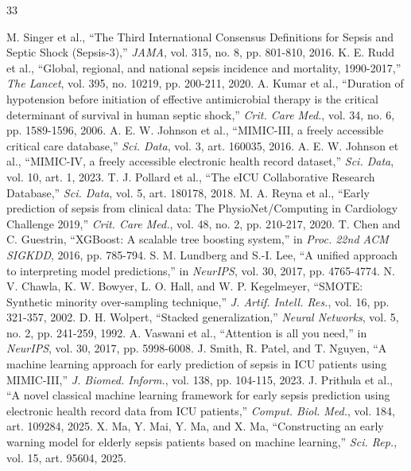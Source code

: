 \documentclass[conference]{IEEEtran}
\begin{document}
\begin{thebibliography}{33}

 M. Singer et al., ``The Third International Consensus Definitions for Sepsis and Septic Shock (Sepsis-3),'' \emph{JAMA}, vol. 315, no. 8, pp. 801-810, 2016.
 K. E. Rudd et al., ``Global, regional, and national sepsis incidence and mortality, 1990-2017,'' \emph{The Lancet}, vol. 395, no. 10219, pp. 200-211, 2020.
 A. Kumar et al., ``Duration of hypotension before initiation of effective antimicrobial therapy is the critical determinant of survival in human septic shock,'' \emph{Crit. Care Med.}, vol. 34, no. 6, pp. 1589-1596, 2006.
 A. E. W. Johnson et al., ``MIMIC-III, a freely accessible critical care database,'' \emph{Sci. Data}, vol. 3, art. 160035, 2016.
 A. E. W. Johnson et al., ``MIMIC-IV, a freely accessible electronic health record dataset,'' \emph{Sci. Data}, vol. 10, art. 1, 2023.
 T. J. Pollard et al., ``The eICU Collaborative Research Database,'' \emph{Sci. Data}, vol. 5, art. 180178, 2018.
 M. A. Reyna et al., ``Early prediction of sepsis from clinical data: The PhysioNet/Computing in Cardiology Challenge 2019,'' \emph{Crit. Care Med.}, vol. 48, no. 2, pp. 210-217, 2020.
 T. Chen and C. Guestrin, ``XGBoost: A scalable tree boosting system,'' in \emph{Proc. 22nd ACM SIGKDD}, 2016, pp. 785-794.
 S. M. Lundberg and S.-I. Lee, ``A unified approach to interpreting model predictions,'' in \emph{NeurIPS}, vol. 30, 2017, pp. 4765-4774.
 N. V. Chawla, K. W. Bowyer, L. O. Hall, and W. P. Kegelmeyer, ``SMOTE: Synthetic minority over-sampling technique,'' \emph{J. Artif. Intell. Res.}, vol. 16, pp. 321-357, 2002.
 D. H. Wolpert, ``Stacked generalization,'' \emph{Neural Networks}, vol. 5, no. 2, pp. 241-259, 1992.
 A. Vaswani et al., ``Attention is all you need,'' in \emph{NeurIPS}, vol. 30, 2017, pp. 5998-6008.
 J. Smith, R. Patel, and T. Nguyen, ``A machine learning approach for early prediction of sepsis in ICU patients using MIMIC-III,'' \emph{J. Biomed. Inform.}, vol. 138, pp. 104-115, 2023.
 J. Prithula et al., ``A novel classical machine learning framework for early sepsis prediction using electronic health record data from ICU patients,'' \emph{Comput. Biol. Med.}, vol. 184, art. 109284, 2025.
 X. Ma, Y. Mai, Y. Ma, and X. Ma, ``Constructing an early warning model for elderly sepsis patients based on machine learning,'' \emph{Sci. Rep.}, vol. 15, art. 95604, 2025.

\end{thebibliography}
\end{document}
